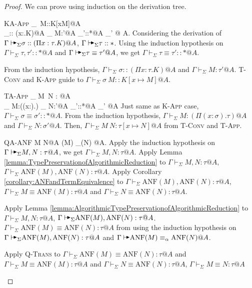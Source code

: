 \documentclass[9pt, a4paper]{extarticle}
\theoremstyle{break}
\newcommand{\G}{\Gamma}
\newcommand{\V}{\vdash_\Sigma}
\newcommand{\TB}{{\mathop{\blacktriangleright}}}
\newcommand{\E}{\equiv}
\newcommand{\KApp}{\textsc{K-App}\xspace}
\newcommand{\KAApp}{\textsc{KA-App}\xspace}
\newcommand{\TApp}{\textsc{T-App}\xspace}
\newcommand{\TConv}{\textsc{T-Conv}\xspace}
\newcommand{\TAApp}{\textsc{TA-App}\xspace}
\newcommand{\QTrans}{\textsc{Q-Trans}\xspace}
\newcommand{\AV}{\vdash\!\!\!\raisebox{0.4ex}{\scalebox{0.7}{$\TB$}}}
\newcommand{\AVS}{\AV_\Sigma\xspace}
\newcommand{\ANF}{\text{ANF}}
\begin{document}
\begin{proof}
    We can prove using induction on the derivation tree.
    \begin{rneqncase}{\KAApp{}}{
            \G\AVS \sigma\ M::K[x\mapsto M]@A \\
            \G\AVS \sigma:: (\Pi x:\tau.K)@A \text{ , }
            \G\AVS M:\tau'@A \text{ , } 
            \G\AVS\tau'::*@A  
            \G\AVS \tau \E \tau' @ A.
        }
        Considering the derivation of \( \G\AVS \sigma:: (\Pi x:\tau.K)@A \), \( \G \AVS \tau::* \).
        Using the induction hypothesis on \( \G \V \tau, \tau'::* @ A \) and \( \G\AVS \tau \E \tau' @ A \),
        we get \( \G\V \tau \E \tau' :: * @ A \).

        From the induction hypothesis, \( \G\V \sigma:: (\Pi x:\tau.K)@A \) and \( \G\V M:\tau'@A \).
        \TConv and \KApp guide to \( \G\V \sigma\ M::K[x\mapsto M]@A \).

    \end{rneqncase}
    \begin{rneqncase}{\TAApp}{
            \G\AVS M\ N : \tau[x\mapsto N]@A \\
            \G\AVS M:(\Pi (x:\sigma).\tau) \text{ , }
            \G\AVS N:\sigma'@A \text{ , }
            \G\AVS \sigma'::*@A 
            \G\AVS \sigma\E\sigma' @A
        }
        Just same as \KApp case, \( \G\V \sigma\E\sigma' :: * @A \).
        From the induction hypothesis, \( \G\V M:(\Pi (x:\sigma).\tau) @ A\) and \( \G\V N:\sigma'@A \).
        Then, \( \G\V M\ N : \tau[x\mapsto N]@A \) from \TConv and \TApp.
    \end{rneqncase}
    \begin{rneqncase}{\textsc{QA-ANF}}{
            \G \AV M \E N@A
            \G \AV \ANF(M) \E_\alpha \ANF(N) @A.
        }
        Apply the induction hypothesis on \( \G \AVS M, N : \tau @ A \), we get \( \G \V M, N : \tau @ A \).
        Apply Lemma \ref{lemma:TypePreservationofAlgorithmicReduction} to \( \G \V M, N : \tau @ A \), \( \G \V \ANF(M), \ANF(N) : \tau @ A \).
        Apply Corollary \ref{corollary:ANFandTermEquivalence} to \( \G \V \ANF(M), \ANF(N) : \tau @ A \), \( \G \V M \E \ANF(M) : \tau @ A \) and \( \G \V N \E \ANF(N) : \tau @ A \).

        Apply Lemma \ref{lemma:AlgorithmicTypePreservationofAlgorithmicReduction} to \( \G \V M, N : \tau @ A \), \( \G \AVS \ANF(M), \ANF(N) : \tau @ A \).
        \( \G \V \ANF(M) \E \ANF(N) : \tau @ A \) from using the induction hypothesis on \( \G \AVS \ANF(M), \ANF(N) : \tau @ A \) and \( \G \AV \ANF(M) \E_\alpha \ANF(N) @A \).

        Apply \QTrans to \( \G \V \ANF(M) \E \ANF(N) : \tau @ A \) and \( \G \V M \E \ANF(M) : \tau @ A \) and \( \G \V N \E \ANF(N) : \tau @ A \), \( \G \V M \E N : \tau @ A \)
    \end{rneqncase}
\end{proof}
\end{document}
